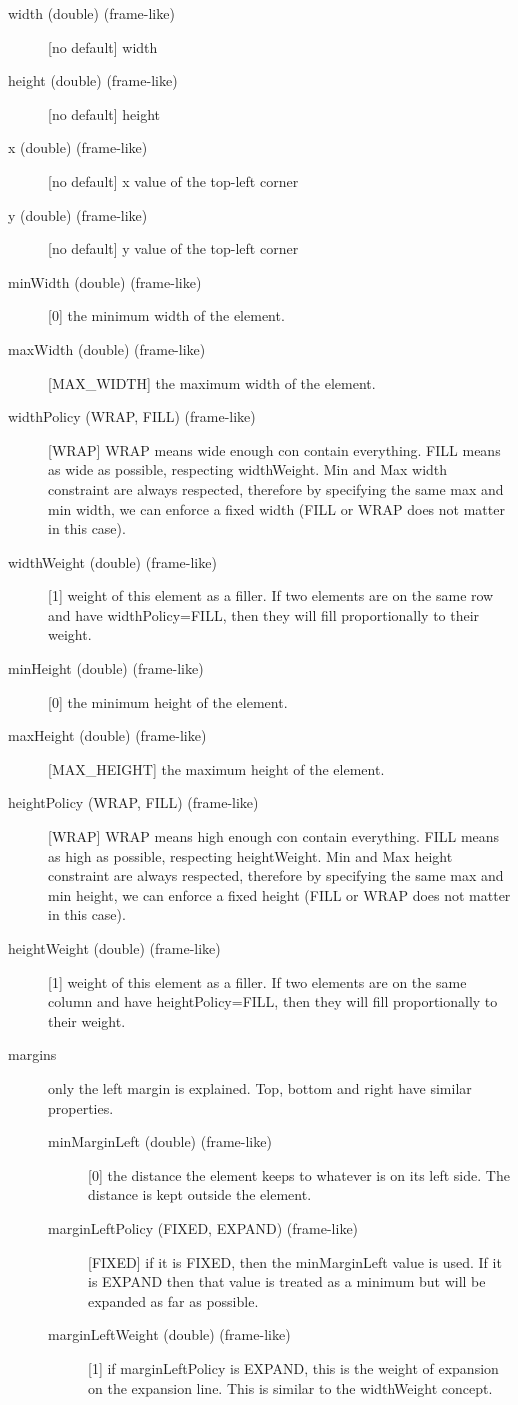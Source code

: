 \begin{description}
\item[width (double) (frame-like)] [no default] width
\item[height (double) (frame-like)] [no default] height
\item[x (double) (frame-like)] [no default] x value of the top-left corner
\item[y (double) (frame-like)] [no default] y value of the top-left corner

\item[minWidth (double) (frame-like)] [0] the minimum width of the element.
\item[maxWidth (double) (frame-like)] [MAX\_WIDTH] the maximum width of the element.
\item[widthPolicy (WRAP, FILL) (frame-like)] [WRAP] WRAP means wide enough con contain everything. FILL means as wide as possible, respecting widthWeight. Min and Max width constraint are always respected, therefore by specifying the same max and min width, we can enforce a fixed width (FILL or WRAP does not matter in this case).
\item[widthWeight (double) (frame-like)] [1] weight of this element as a filler. If two elements are on the same row and have widthPolicy=FILL, then they will fill proportionally to their weight.
\item[minHeight (double) (frame-like)] [0] the minimum height of the element.
\item[maxHeight (double) (frame-like)] [MAX\_HEIGHT] the maximum height of the element.
\item[heightPolicy (WRAP, FILL) (frame-like)] [WRAP] WRAP means high enough con contain everything. FILL means as high as possible, respecting heightWeight. Min and Max height constraint are always respected, therefore by specifying the same max and min height, we can enforce a fixed height (FILL or WRAP does not matter in this case).
\item[heightWeight (double) (frame-like)] [1] weight of this element as a filler. If two elements are on the same column and have heightPolicy=FILL, then they will fill proportionally to their weight.

\item[margins] only the left margin is explained. Top, bottom and right have similar properties.
\begin{description}
    \item[minMarginLeft (double) (frame-like)] [0] the distance the element keeps to whatever is on its left side. The distance is kept outside the element.
    \item[marginLeftPolicy (FIXED, EXPAND) (frame-like)] [FIXED] if it is FIXED, then the minMarginLeft value is used. If it is EXPAND then that value is treated as a minimum but will be expanded as far as possible.
    \item[marginLeftWeight (double) (frame-like)] [1] if marginLeftPolicy is EXPAND, this is the weight of expansion on the expansion line. This is similar to the widthWeight concept.
\end{description}


\end{description}
